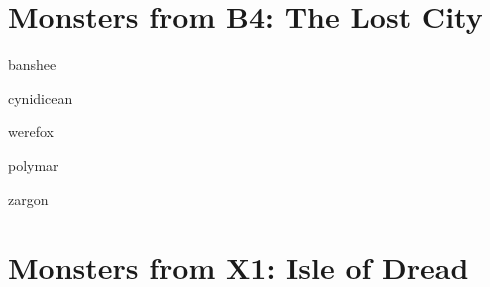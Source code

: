 \documentclass[a4paper,serif]{module}
\begin{document}
\part{Monsters from B4: The Lost City}

\begin{newmonster}{banshee}\end{newmonster}
\begin{newmonster}{cynidicean}\end{newmonster}
\begin{newmonster}{werefox}\end{newmonster}
\begin{newmonster}{polymar}\end{newmonster}
\begin{newmonster}{zargon}\end{newmonster}

\part{Monsters from X1: Isle of Dread}
\end{document}
